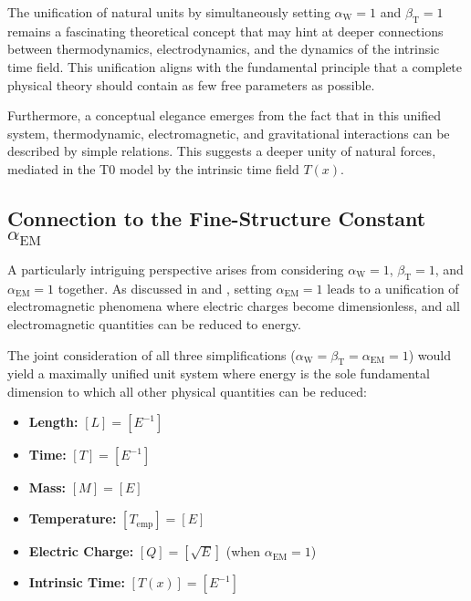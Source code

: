 \documentclass[12pt,a4paper]{article}
\newcommand{\Tfield}{T(x)}
\newcommand{\betaT}{\beta_{\text{T}}}
\newcommand{\alphaEM}{\alpha_{\text{EM}}}
\newcommand{\alphaW}{\alpha_{\text{W}}}
\begin{document}
	The unification of natural units by simultaneously setting \(\alphaW = 1\) and \(\betaT = 1\) remains a fascinating theoretical concept that may hint at deeper connections between thermodynamics, electrodynamics, and the dynamics of the intrinsic time field. This unification aligns with the fundamental principle that a complete physical theory should contain as few free parameters as possible.
	
	Furthermore, a conceptual elegance emerges from the fact that in this unified system, thermodynamic, electromagnetic, and gravitational interactions can be described by simple relations. This suggests a deeper unity of natural forces, mediated in the T0 model by the intrinsic time field \(\Tfield\).
	
	\subsection{Connection to the Fine-Structure Constant \(\alphaEM\)}
	
	A particularly intriguing perspective arises from considering \(\alphaW = 1\), \(\betaT = 1\), and \(\alphaEM = 1\) together. As discussed in \cite{pascher_alpha_2025} and \cite{pascher_alphabeta_2025}, setting \(\alphaEM = 1\) leads to a unification of electromagnetic phenomena where electric charges become dimensionless, and all electromagnetic quantities can be reduced to energy.
	
	The joint consideration of all three simplifications (\(\alphaW = \betaT = \alphaEM = 1\)) would yield a maximally unified unit system where energy is the sole fundamental dimension to which all other physical quantities can be reduced:
	
	\begin{tcolorbox}[colback=blue!5!white,colframe=blue!75!black,title=Fully Unified Unit System]
		\begin{itemize}
			\item \textbf{Length:} \([L] = [E^{-1}]\)
			\item \textbf{Time:} \([T] = [E^{-1}]\)
			\item \textbf{Mass:} \([M] = [E]\)
			\item \textbf{Temperature:} \([T_{\text{emp}}] = [E]\)
			\item \textbf{Electric Charge:} \([Q] = [\sqrt{E}]\) (when \(\alphaEM = 1\))
			\item \textbf{Intrinsic Time:} \([\Tfield] = [E^{-1}]\)
		\end{itemize}
	\end{tcolorbox}
	
\end{document}
